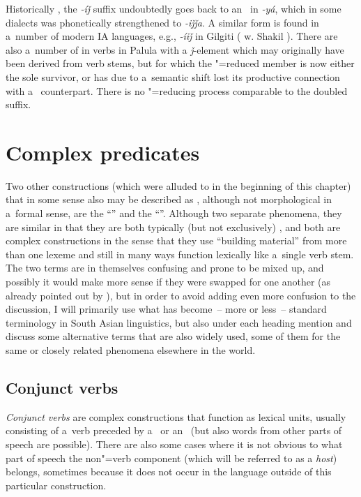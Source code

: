 Historically \citep[316--317]{masica1991}, the \textit{-íǰ} suffix undoubtedly goes back to an~\iliOIA {} in \textit{-yá}, which in some \iliMIA dialects was phonetically strengthened to \textit{-iǰǰa}. A similar form is found in a~number of modern IA languages, e.g., \textit{-íiǰ} in Gilgiti \iliShina (\citeauthor{radloffshakil1998} w. Shakil \citeyear[116]{radloffshakil1998}). There are also a~number of in verbs in Palula with a \textit{ǰ}-element which may originally have been derived from  verb stems, but for which the "=reduced member is now either the sole survivor, or has due to a~semantic shift lost its productive connection with a~ counterpart. There is no "=reducing process comparable to the doubled  suffix.


\section{Complex predicates}
\label{sec:8-6}


Two other constructions (which were alluded to in the beginning of this chapter) that in some sense also may be described as , although not morphological in a~formal sense, are the ``'' and the ``''. Although two separate phenomena, they are similar in that they are both typically (but not exclusively) \iliIndoAryan, and both are complex constructions in the sense that they use ``building material'' from more than one lexeme and still in many ways function lexically like a~single verb stem. The two terms are in themselves confusing and prone to be mixed up, and possibly it would make more sense if they were swapped for one another (as already pointed out by \citealt[326]{masica1991}), but in order to avoid adding even more confusion to the discussion, I will primarily use what has become~-- more or less~-- standard terminology in South Asian linguistics, but also under each heading mention and discuss some alternative terms that are also widely used, some of them for the same or closely related phenomena elsewhere in the world.


\subsection{Conjunct verbs}
\label{subsec:8-6-1}

\textit{Conjunct verbs} are complex constructions that function as lexical units, usually consisting of a~verb preceded by a~ or an~ (but also words from other parts of speech are possible). There are also some cases where it is not obvious to what part of speech the non"=verb component (which will be referred to as a \textit{host}) belongs, sometimes because it does not occur in the language outside of this particular  construction. 



